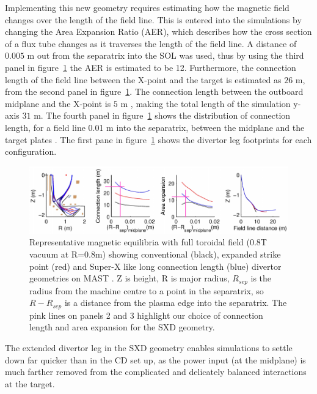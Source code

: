 \documentclass[12pt]{article}  %
\begin{document}
Implementing this new geometry requires estimating how the magnetic field changes over the length of the field line. This is entered into the simulations by changing the Area Expansion Ratio (AER), which describes how the cross section of a flux tube changes as it traverses the length of the field line. A distance of $0.005$ m out from the separatrix into the SOL was used, thus by using the third panel in figure~\ref{figMASTUdesignpapersFig2} the AER is estimated to be 12. Furthermore, the connection length of the field line between the X-point and the target is estimated as $26$ m, from the second panel in figure~\ref{figMASTUdesignpapersFig2}. The connection length between the outboard midplane and the X-point is $5$ m \cite{Fishpool2013}, making the total length of the simulation y-axis $31$ m. The fourth panel in figure~\ref{figMASTUdesignpapersFig2} shows the distribution of connection length, for a field line 0.01 m into the separatrix, between the midplane and the target plates \cite{Fishpool2013}. The first pane in figure~\ref{figMASTUdesignpapersFig2} shows the divertor leg footprints for each configuration.

\begin{figure}
\includegraphics[scale=0.75]{Figures/MASTUdesignpapersFig2_2.png}
\centering
\caption{Representative magnetic equilibria with full toroidal field (0.8T vacuum at R=0.8m) showing conventional (black), expanded strike point (red) and Super-X like long connection length (blue) divertor geometries on MAST \cite{Fishpool2013}. Z is height, R is major radius, $ R_{sep} $ is the radius from the machine centre to a point in the separatrix, so $ R - R_{sep} $ is a distance from the plasma edge into the separatrix. The pink lines on panels 2 and 3 highlight our choice of connection length and area expansion for the SXD geometry.}\label{figMASTUdesignpapersFig2}
\end{figure}

The extended divertor leg in the SXD geometry enables simulations to settle down far quicker than in the CD set up, as the power input (at the midplane) is much farther removed from the complicated and delicately balanced interactions at the target.
\end{document}
